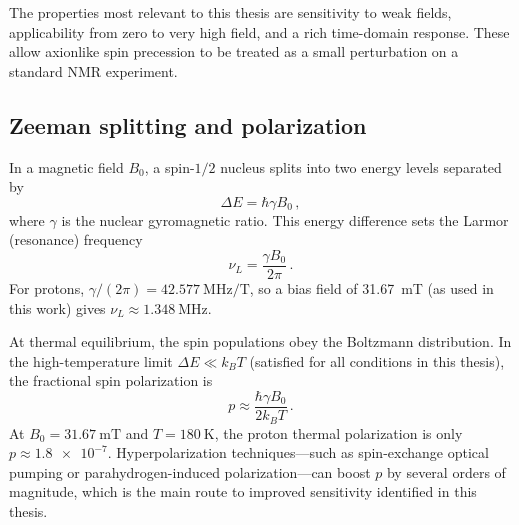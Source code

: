 The properties most relevant to this thesis are sensitivity to weak fields, applicability from zero to very high field, and a rich time-domain response.
These allow axionlike spin precession to be treated as a small perturbation on a standard NMR experiment.

\subsection{Zeeman splitting and polarization}\label{sec:NMR:Zeeman}
In a magnetic field $B_0$, a spin-$1/2$ nucleus splits into two energy levels separated by
\begin{equation}
    \Delta E = \hbar \gamma B_0
    \,,\label{eq:Zeeman}
\end{equation}
where $\gamma$ is the nuclear gyromagnetic ratio.
This energy difference sets the Larmor (resonance) frequency
\begin{equation}
    \nu_L = \frac{\gamma B_0}{2\pi}
    \,.\label{eq:Larmor}
\end{equation}
For protons, $\gamma/(2\pi) = \SI{42.577}{\MHz/\tesla}$, so a bias field of \SI{31.67}{\milli\tesla} (as used in this work) gives $\nu_L \approx \SI{1.348}{\MHz}$.

At thermal equilibrium, the spin populations obey the Boltzmann distribution.
In the high-temperature limit $\Delta E \ll k_B T$ (satisfied for all conditions in this thesis), the fractional spin polarization is
\begin{equation}
    p \approx \frac{\hbar \gamma B_0}{2 k_B T}
    \,.\label{eq:thermalp}
\end{equation}
At $B_0 = \SI{31.67}{\milli\tesla}$ and $T = \SI{180}{\kelvin}$, the proton thermal polarization is only $p \approx \num{1.8e-7}$.
Hyperpolarization techniques---such as spin-exchange optical pumping or parahydrogen-induced polarization---can boost $p$ by several orders of magnitude, which is the main route to improved sensitivity identified in this thesis.

